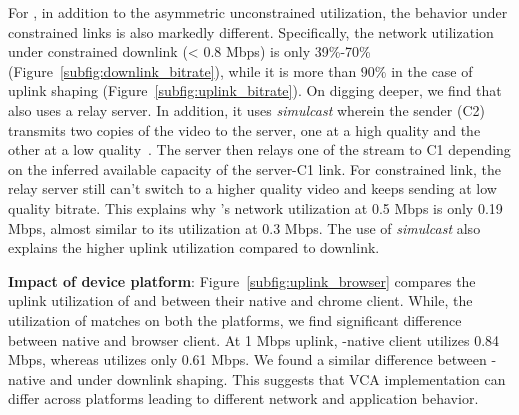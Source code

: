For \meet, in addition to the asymmetric unconstrained utilization, the behavior under constrained links is also markedly different. Specifically, the network utilization under constrained downlink (< 0.8 Mbps) is only 39\%-70\% (Figure~\ref{subfig:downlink_bitrate}), while it is more than $90\%$ in the case of uplink shaping (Figure~\ref{subfig:uplink_bitrate}). On digging deeper, we find that \meet also uses a relay server. In addition, it uses \textit{simulcast} wherein the sender (C2) transmits two copies of the video to the server, one at a high quality and the other at a low quality~\cite{nistico2020comparative}. The server then relays one of the stream to C1 depending on the inferred available capacity of the server-C1 link. For constrained link, the relay server still can't switch to a higher quality video and keeps sending at low quality bitrate. This explains why \meet's network utilization at 0.5 Mbps is only 0.19 Mbps, almost similar to its utilization at 0.3 Mbps.  The use of \textit{simulcast} also explains the higher uplink utilization compared to downlink. %



\textbf{Impact of device platform}: Figure~\ref{subfig:uplink_browser} compares the uplink utilization of \zoom and \teams between their native and chrome client. While, the utilization of \zoom matches on both the platforms, we find significant difference between \teams native and browser client. At 1 Mbps uplink, \teams-native client utilizes 0.84 Mbps, whereas \teamsbrowser utilizes only 0.61 Mbps. We found a similar difference between \teams-native and \teamsbrowser under downlink shaping. This suggests that VCA implementation can differ across platforms leading to different network and application behavior. 


